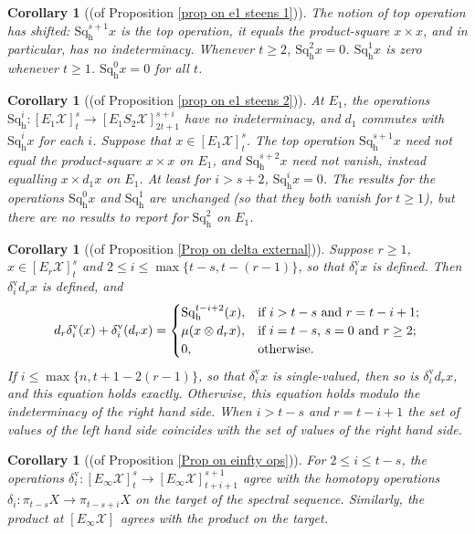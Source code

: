 \documentclass[11pt]{amsart} \renewcommand{\baselinestretch}{1.2}
\theoremstyle{plain}
\newtheorem{cor}[thm]{Corollary}
\numberwithin{equation}{section} %
\theoremstyle{plain}
\newtheorem{cor}[thm]{Corollary}
\numberwithin{equation}{chapter} %
\renewcommand{\to}{\longrightarrow}
\newcommand{\calx}{\mathcal{X}}
\newcommand{\E}[5]{[E^{#1}_{#2}#3]^{#4}_{#5}}
\newcommand{\Edownup}[5]{[E_{#1}^{#2}#3]^{#4}_{#5}}
\newcommand{\uver}{^\mathrm{v}}
\newcommand{\dhor}{_\mathrm{h}}
\newcommand{\Sqh}{\mathrm{Sq}\dhor}
\newcommand{\deltav}{\delta\uver}
\begin{document}
\begin{Operations on the Bousfield-Kan spectral sequence}
\begin{cor}[(of Proposition \ref{prop on e1 steens 1})]
The notion of \emph{top operation} has shifted: $\Sqh^{s+1}x$ is the top operation, it equals the product-square $x\times x$, and in particular,  has no indeterminacy.
Whenever $t\geq2$, $\Sqh^2x=0$. $\Sqh^1x$ is zero whenever $t\geq1$. $\Sqh^0x=0$ for all $t$.
\end{cor}

\begin{cor}[(of Proposition \ref{prop on e1 steens 2})]
\label{prop on e1 steens 2 composed with lift}
At $E_1$, the operations $\Sqh^i:\Edownup{1}{}{\calx}{s}{t}\to \Edownup{1}{}{S_2\calx}{s+i}{2t+1}$ have no indeterminacy, and $d_{1}$ commutes with $\Sqh^ix $ for each $i$. Suppose that $x\in \Edownup{1}{}{\calx}{s}{t}$.
The top operation $\Sqh^{s+1}x$ \emph{need not} equal the product-square $x\times x$ on $E_1$, and
$\Sqh^{s+2}x$ \emph{need not} vanish, instead equalling $x\times d_1x$ on $E_1$.
At least for $i>s+2$, $\Sqh^ix=0$. The results for the operations $\Sqh^0x$ and $\Sqh^{1}$ are unchanged (so that they both vanish for $t\geq1$), but there are no results to report for $\Sqh^{2}$ on $E_1$.
\end{cor}


\begin{cor}[(of Proposition \ref{Prop on delta external})]
\label{cor on delta external composed with lift}
Suppose $r\geq1$, $x\in \E{}{r}{\calx}{s}{t}$ and $2\leq i\leq \max\{t-s,t-(r-1)\}$, so that $\deltav_ix $ is defined. Then $\deltav_i d_r x$ is defined, and 
\[d_r\deltav_i(x)+ \deltav_i(d_rx)=\begin{cases}
\Sqh^{t-i+2}(x),&\textup{if $i>t-s$ and $r =t-i+1$};\\
\mu(x\otimes d_rx),&\textup{if $i=t-s$,  $s=0$ and $r\geq2$};\\
0,&\textup{otherwise.}
\end{cases}\]
If $i\leq \max\{n,t+1-2(r-1)\}$, so that $\deltav_i x$ is single-valued, then so is $\deltav_i d_r x$, and this equation holds exactly. Otherwise, this equation holds modulo the indeterminacy of the right hand side. When $i>t-s$ and $r =t-i+1$ the set of values of the left hand side coincides with the set of values of the right hand side.
\end{cor}


\begin{cor}[(of Proposition \ref{Prop on einfty ops})]
\label{Prop on einfty ops composed with lift}
For $2\leq i\leq t-s$, the operations $\deltav_i:\E{}{\infty}{\calx}{s}{t}\to \E{}{\infty}{\calx}{s+1}{t+i+1}$ agree with the homotopy operations $\delta_i:\pi_{t-s}X\to \pi_{t-s+i}X$ on the target of the spectral sequence. Similarly, the product at $\E{}{\infty}{\calx}{}{}$ agrees with the product on the target.
\end{cor}




\end{Operations on the Bousfield-Kan spectral sequence}
\end{document}
